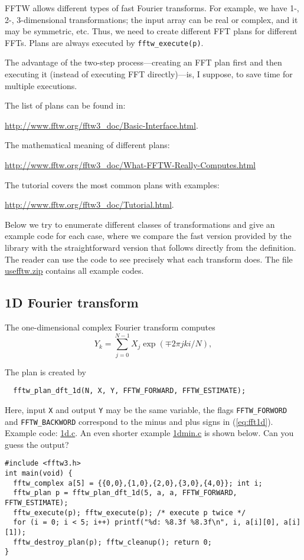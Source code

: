 \documentclass[12pt]{article}
\begin{document}
FFTW allows different types of fast Fourier transforms.
For example, we have 1-, 2-, 3-dimensional transformations;
the input array can be real or complex,
and it may be symmetric, etc.
%
Thus, we need to create different FFT plans for different FFTs.
%
Plans are always executed by
\texttt{fftw\_execute(p)}.

The advantage of the two-step process---creating an FFT plan first
  and then executing it
  (instead of executing FFT directly)---is, I suppose,
  to save time for multiple executions.

The list of plans can be found in:

\url{http://www.fftw.org/fftw3_doc/Basic-Interface.html}.

The mathematical meaning of different plans:

\url{http://www.fftw.org/fftw3_doc/What-FFTW-Really-Computes.html}

The tutorial covers the most common plans with examples:

\url{http://www.fftw.org/fftw3_doc/Tutorial.html}.


Below we try to enumerate different classes of transformations
and give an example code for each case,
where we compare the fast version provided by the library
with the straightforward version that follows directly from the definition.
%
The reader can use the code to
  see precisely what each transform does.
%
The file \url{usefftw.zip} contains all example codes.




\subsection{1D Fourier transform}

The one-dimensional complex Fourier transform computes
%
\begin{equation}
  Y_k = \sum_{j = 0}^{N - 1} X_j \exp(\mp 2 \pi j k i / N),
  \label{eq:fft1d}
\end{equation}
%
%


The plan is created by
\begin{verbatim}
  fftw_plan_dft_1d(N, X, Y, FFTW_FORWARD, FFTW_ESTIMATE);
\end{verbatim}
Here, input \texttt{X} and output \texttt{Y} may be the same variable,
  the flags \texttt{FFTW\_FORWORD} and \texttt{FFTW\_BACKWORD}
  correspond to the minus and plus signs in (\ref{eq:fft1d}).
%
Example code: \url{1d.c}.
%
An even shorter example \url{1dmin.c} is shown below.
Can you guess the output?
{\footnotesize
\begin{verbatim}
#include <fftw3.h>
int main(void) {
  fftw_complex a[5] = {{0,0},{1,0},{2,0},{3,0},{4,0}}; int i;
  fftw_plan p = fftw_plan_dft_1d(5, a, a, FFTW_FORWARD, FFTW_ESTIMATE);
  fftw_execute(p); fftw_execute(p); /* execute p twice */
  for (i = 0; i < 5; i++) printf("%d: %8.3f %8.3f\n", i, a[i][0], a[i][1]);
  fftw_destroy_plan(p); fftw_cleanup(); return 0;
}
\end{verbatim}
}
%
\end{document}
